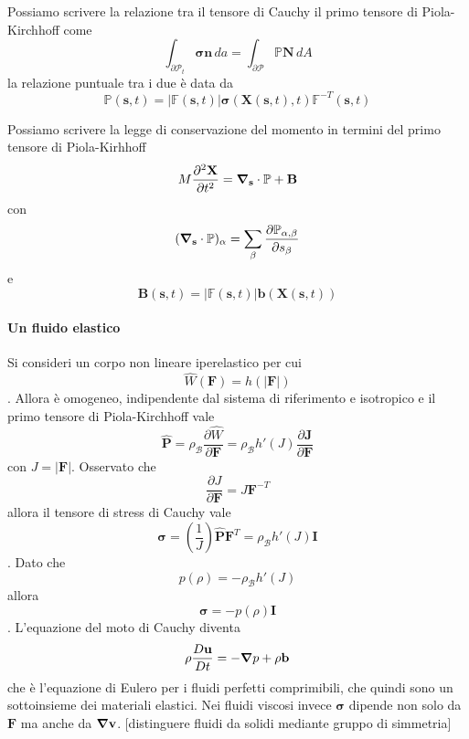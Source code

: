 Possiamo scrivere la relazione tra il tensore di Cauchy il primo tensore di Piola-Kirchhoff come
\begin{equation*}
\int_{\partial\mathcal{P}_t} \boldsymbol{\sigma}\mathbf{n} \, da = \int_{\partial\mathcal{P}} \mathbb{P}\mathbf{N} \, dA
\end{equation*}
la relazione puntuale tra i due è data da
\begin{equation*}
\mathbb{P}(\mathbf{s},t) = \vert \mathbb{F}(\mathbf{s},t) \vert \mathbf{\sigma}(\mathbf{X}(\mathbf{s},t),t) \mathbb{F}^{-T}(\mathbf{s},t)
\end{equation*}

Possiamo scrivere la legge di conservazione del momento in termini del primo tensore di Piola-Kirhhoff
\begin{equation*}
M\frac{\partial^2\mathbf{X}}{\partial t^2} = \boldsymbol{\nabla}_\mathbf{s} \cdot \mathbb{P} + \mathbf{B}
\end{equation*}
con 
\begin{equation*}
(\boldsymbol{\nabla}_\mathbf{s} \cdot \mathbb{P} )_{\alpha} = \sum_{\beta}\frac{\partial\mathbb{P}_{\alpha,\beta}}{\partial s_\beta}
\end{equation*}
e
\begin{equation*}
\mathbf{B}(\mathbf{s},t)=\vert\mathbb{F}(\mathbf{s},t)\vert\mathbf{b}(\mathbf{X}(\mathbf{s},t))
\end{equation*}
%

\paragraph{Un fluido elastico}
Si consideri un corpo non lineare iperelastico per cui
$$\widehat{W}(\mathbf{F}) = h(|\mathbf{F}|)$$.
Allora è omogeneo, indipendente dal sistema di riferimento e isotropico e il primo tensore di Piola-Kirchhoff vale
$$\widehat{\mathbf{P}}=\rho_{\mathcal{B}}\frac{\partial \widehat{W}}{\partial \mathbf{F}} = \rho_{\mathcal{B}}h'(J)\frac{\partial \mathbf{J}}{\partial \mathbf{F}}$$
con $J = |\mathbf{F}|$.
Osservato che 
$$\frac{\partial J}{\partial \mathbf{F}} = J\mathbf{F}^{-T}$$
allora il tensore di stress di Cauchy vale
$$\boldsymbol{\sigma}=(\frac{1}{J})\widehat{\mathbf{P}}\mathbf{F}^{T}=\rho_{\mathcal{B}}h'(J)\mathbf{I}$$.
Dato che
$$p(\rho)=-\rho_{\mathcal{B}}h'(J)$$
allora
$$\boldsymbol{\sigma}=-p(\rho)\mathbf{I}$$.
L'equazione del moto di Cauchy diventa
$$\rho\frac{D \mathbf{u}}{Dt} = -\boldsymbol{\nabla} p+\rho\mathbf{b}$$
che è l'equazione di Eulero per i fluidi perfetti comprimibili, che quindi sono un sottoinsieme dei materiali elastici.
Nei fluidi viscosi invece $\boldsymbol{\sigma}$ dipende non solo da $\mathbf{F}$ ma anche da $\boldsymbol{\nabla}\mathbf{v}$.
[distinguere fluidi da solidi mediante gruppo di simmetria]
